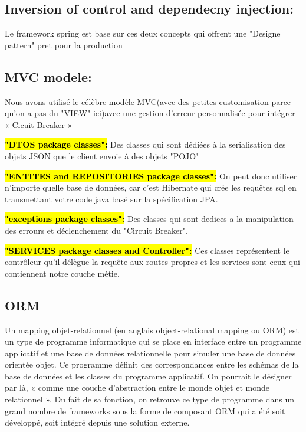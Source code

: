 \subsection{Inversion of control and dependecny injection:}
Le framework spring est base sur ces deux concepts qui offrent une "Designe pattern" pret pour la production

\subsection{MVC modele:}
Nous avons utilisé le célèbre modèle MVC(avec des petites customisation parce qu'on a pas du "VIEW" ici)avec une gestion d'erreur personnalisée pour intégrer « Cicuit Breaker » 

\begin{figure}[h]
\centering
    \centering
\end{figure}

\hl{\textbf{"DTOS package classes":}}
Des classes qui sont dédiées à la serialisation des objets JSON que le client envoie à des objets "POJO"


\hl{\textbf{"ENTITES and REPOSITORIES package classes":}}
On peut donc utiliser n'importe quelle base de données, car c'est Hibernate qui crée les requêtes sql en transmettant votre code java basé sur la spécification JPA. 

\hl{\textbf{"exceptions package classes":}}
Des classes qui sont dediees a la manipulation des errours et déclenchement du "Circuit Breaker".

\hl{\textbf{"SERVICES package classes and Controller":}}
Ces classes représentent le contrôleur qu'il délègue la requête aux routes propres et les services sont ceux qui contiennent notre couche métie.


\subsection{ORM}
Un mapping objet-relationnel (en anglais object-relational mapping ou ORM) est un type de programme informatique qui se place en interface entre un programme applicatif et une base de données relationnelle pour simuler une base de données orientée objet. Ce programme définit des correspondances entre les schémas de la base de données et les classes du programme applicatif. On pourrait le désigner par là, « comme une couche d'abstraction entre le monde objet et monde relationnel ». Du fait de sa fonction, on retrouve ce type de programme dans un grand nombre de frameworks sous la forme de composant ORM qui a été soit développé, soit intégré depuis une solution externe. 

